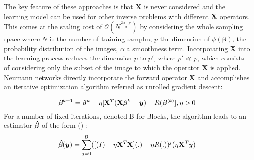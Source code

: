 \documentclass[12pt,twoside]{article}
\begin{document}
 The key feature of these approaches is that $ \mathbf{X}$ is never considered and the learning model can be used for other inverse problems with different ${\mathbf X}$ operators.
 This comes at the scaling cost of $\mathcal{O}(N^{ \frac{2 \alpha + p} {\alpha} })$ by considering the whole sampling space
  where $N$ is the number of training samples, $p$ the dimension of $\phi(\bm{\beta})$, the probability distribution of the images, $\alpha$ a smoothness term.
  Incorporating $\mathbf{X}$ into the learning process reduces the dimension $p$ to $p'$, where $p' \ll p$, which consists of considering only the subset of the image to which the operator $\mathbf{X}$ is applied.
  Neumann networks directly incorporate the forward operator $\mathbf{X}$ and accomplishes an iterative optimization algorithm referred as unrolled gradient descent:
  
  $$ \bm{\beta}^{k+1} =  \bm{\beta}^{k} -\eta [{\mathbf X}^T ({\mathbf X} \bm{\beta}^{k} - \bm{y}) + R(\bm{\beta}^{(k)}], \eta > 0$$
  For a number of fixed iterations, denoted B for Blocks, the algorithm leads to an estimator $\bm{\hat{\beta}}$ of the form (\cite{DBLP:journals/corr/abs-1901-03707}) :
  $$ \bm{\hat{\beta}}(\bm{y}) = \sum_{j=0}^B ([ {\mathbf (}I) -\eta {\mathbf X}^T {\mathbf X}](.) -\eta R(.))^j (\eta {\mathbf X}^T \bm{y})$$
  
\end{document}
